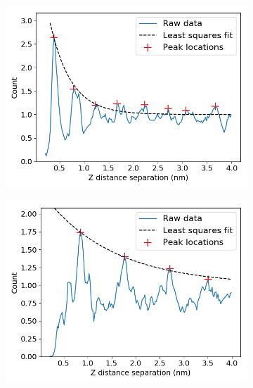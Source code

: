 \documentclass{article}
\begin{document}
  
  \begin{figure}
  \centering
  \begin{subfigure}{0.45\textwidth}
  \centering
  \includegraphics[width=\textwidth]{z_correlation_sandwich.png}
  \caption{}\label{fig:z_correlation_sandwich}
  \end{subfigure}  
  \begin{subfigure}{0.45\textwidth}
  \centering
  \includegraphics[width=\textwidth]{z_correlation_offset.png}
  \caption{}\label{fig:z_correlation_offset}
  \end{subfigure}  
  \begin{subfigure}{0.45\textwidth}

\end{subfigure}
\end{figure}
\end{document}

